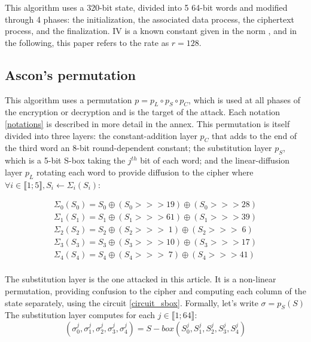 \documentclass[11pt,technote]{IEEEtran}
\begin{document}
		\begin{algorithm}[h]
		\end{algorithm}
		
		This algorithm uses a 320-bit state, divided into 5 64-bit words and modified through 4 phases: the initialization, the associated data process, the ciphertext process, and the finalization. IV is a known constant given in the norm \cite{norme}, and in the following, this paper refers to the rate as $r=128$.
		
		
		\subsection{Ascon's permutation}	\label{perm}	
		This algorithm uses a permutation $p = p_L \circ p_S \circ p_C$, which is used at all phases of the encryption or decryption and is the target of the attack. Each notation \ref{notations} is described in more detail in the annex. This permutation is itself divided into three layers: the constant-addition layer $p_C$ that adds to the end of the third word an 8-bit round-dependent constant; the substitution layer $p_S$, which is a 5-bit S-box taking the $j^{th}$ bit of each word; and the linear-diffusion layer $p_L$ rotating each word to provide diffusion to the cipher where $\forall i \in \llbracket 1;5 \rrbracket, S_i \leftarrow \Sigma_i(S_i)$:
		
		\begin{gather*}
			\Sigma_0(S_0) = S_0 \oplus (S_0 >>> 19) \oplus (S_0 >>> 28)\\
			\Sigma_1(S_1) = S_1 \oplus (S_1 >>> 61) \oplus (S_1 >>> 39)\\
			\Sigma_2(S_2) = S_2 \oplus (S_2 >>> \;  1) \oplus (S_2 >>> \; 6)\\
			\Sigma_3(S_3) = S_3 \oplus (S_3 >>> 10) \oplus (S_3 >>> 17)\\
			\Sigma_4(S_4) = S_4 \oplus (S_4 >>> \; 7) \oplus (S_4 >>> 41)\\
		\end{gather*}
		
		The substitution layer is the one attacked in this article. It is a non-linear permutation, providing confusion to the cipher and computing each column of the state separately, using the circuit \ref{circuit_sbox}. Formally, let's write $\sigma=p_S(S)$\\
		The substitution layer computes for each $j \in \llbracket 1;64 \rrbracket$:
		$$(\sigma_0^j,\sigma_1^j,\sigma_2^j,\sigma_3^j,\sigma_4^j) = S-box(S_0^j,S_1^j,S_2^j,S_3^j,S_4^j)$$
		
\end{document}
